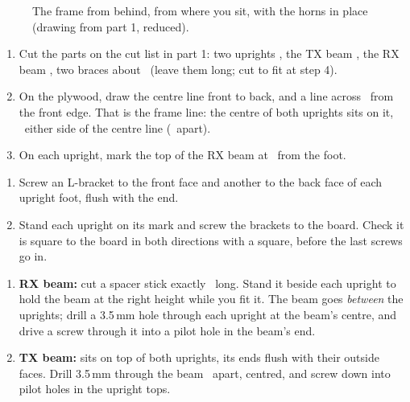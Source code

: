 \documentclass[10pt]{article}
\begin{document}
\begin{figure}[H]
\centering
\scalebox{0.8}{}
\caption{The frame from behind, from where you sit, with the horns in place (drawing from part 1, reduced).}
\end{figure}

\begin{enumerate}
  \item Cut the parts on the cut list in part 1: two uprights \upH, the TX beam \beamLen, the RX beam \beamRXlen, two braces about \braceLen\ (leave them long; cut to fit at step 4).
  \item On the plywood, draw the centre line front to back, and a line across \frontToFrame\ from the front edge. That is the frame line: the centre of both uprights sits on it, \upX\ either side of the centre line (\upCC\ apart).
  \item On each upright, mark the top of the RX beam at \beamRXtop\ from the foot.
\end{enumerate}

\begin{enumerate}
  \item Screw an L-bracket to the front face and another to the back face of each upright foot, flush with the end.
  \item Stand each upright on its mark and screw the brackets to the board. Check it is square to the board in both directions with a square, before the last screws go in.
\end{enumerate}

\begin{enumerate}
  \item \textbf{RX beam:} cut a spacer stick exactly \beamRXbottom\ long. Stand it beside each upright to hold the beam at the right height while you fit it. The beam goes \emph{between} the uprights; drill a 3.5\,mm hole through each upright at the beam's centre, and drive a screw through it into a pilot hole in the beam's end.
  \item \textbf{TX beam:} sits on top of both uprights, its ends flush with their outside faces. Drill 3.5\,mm through the beam \upCC\ apart, centred, and screw down into pilot holes in the upright tops.
\end{enumerate}
\end{document}
